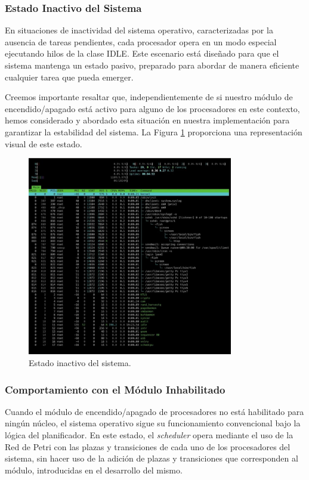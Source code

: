 \subsubsection{Estado Inactivo del Sistema}
En situaciones de inactividad del sistema operativo, caracterizadas por la ausencia de tareas pendientes, cada procesador opera en un modo especial ejecutando hilos de la clase IDLE. Este escenario está diseñado para que el sistema mantenga un estado pasivo, preparado para abordar de manera eficiente cualquier tarea que pueda emerger.\par

Creemos importante resaltar que, independientemente de si nuestro módulo de encendido/apagado está activo para alguno de los procesadores en este contexto, hemos considerado y abordado esta situación en nuestra implementación para garantizar la estabilidad del sistema. La Figura \ref{fig:cpuOnOff-load-inactive} proporciona una representación visual de este estado.\par

\begin{figure}[H]
    \centering
    \includegraphics[width=0.8\textwidth]{images/cpuOnOff-load-inactive.png}
    \caption{Estado inactivo del sistema.}
    \label{fig:cpuOnOff-load-inactive}
\end{figure}

\subsubsection{Comportamiento con el Módulo Inhabilitado}
Cuando el módulo de encendido/apagado de procesadores no está habilitado para ningún núcleo, el sistema operativo sigue su funcionamiento convencional bajo la lógica del planificador. En este estado, el \textit{scheduler} opera mediante el uso de la Red de Petri  con las plazas y transiciones de cada uno de los procesadores del sistema, sin hacer uso de la adición de plazas y transiciones que corresponden al módulo, introducidas en el desarrollo del mismo.\par

